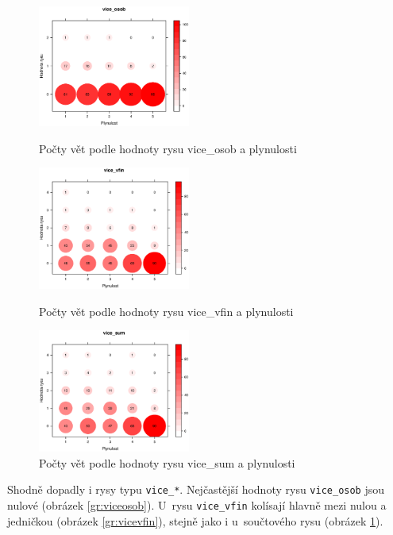 \documentclass[12pt,a4paper]{report}
\begin{document}
\begin{figure}[!htb]
  \centering\includegraphics[width=50mm]{./grafy/rysy/vice_osob-c.eps}
  \caption{Počty vět podle hodnoty rysu vice\_osob a plynulosti}\label{gr:viceosob}
\endminipage\hfill
{}
  \centering\includegraphics[width=50mm]{./grafy/rysy/vice_vfin-c.eps}
  \caption{Počty vět podle hodnoty rysu vice\_vfin a plynulosti}\label{gr:vicevfin}
\endminipage\hfill
{}
  \centering\includegraphics[width=50mm]{./grafy/rysy/vice_sum-c.eps}
  \caption{Počty vět podle hodnoty rysu vice\_sum a plynulosti}\label{gr:vicesum}
\endminipage\hfill
\end{figure}

Shodně dopadly i rysy typu \texttt{vice\_*}. Nejčastější hodnoty rysu \texttt{vice\_osob} jsou nulové (obrázek \ref{gr:viceosob}). U~rysu \texttt{vice\_vfin} kolísají hlavně mezi nulou a jedničkou (obrázek \ref{gr:vicevfin}), stejně jako i u~součtového rysu (obrázek \ref{gr:vicesum}).
\end{document}

